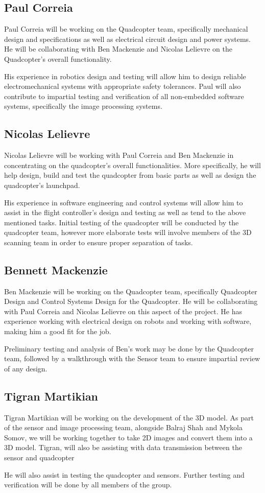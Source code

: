 \documentclass[10pt,letterpaper]{article}
\begin{document}
\subsection{Paul Correia}
Paul Correia will be working on the Quadcopter team, specifically mechanical design and specifications as well as electrical circuit design and power systems. He will be collaborating with Ben Mackenzie and Nicolas Lelievre on the Quadcopter's overall functionality.  \par
His experience in robotics design and testing will allow him to design reliable electromechanical systems with appropriate safety tolerances. Paul will also contribute to impartial testing and verification of all non-embedded software systems, specifically the image processing systems.

\subsection{Nicolas Lelievre} 
Nicolas Lelievre will be working with Paul Correia and Ben Mackenzie in concentrating on the quadcopter's overall functionalities. More specifically, he will help design, build and test the quadcopter from basic parts as well as design the quadcopter's launchpad. \par 
His experience in software engineering and control systems will allow him to assist in the flight controller's design and testing as well as tend to the above mentioned tasks. Initial testing of the quadcopter will be conducted by the quadcopter team, however more elaborate tests will involve members of the 3D scanning team in order to ensure proper separation of tasks. 

\subsection{Bennett Mackenzie} 
Ben Mackenzie will be working on the Quadcopter team, specifically Quadcopter Design and Control Systems Design for the Quadcopter. He will be collaborating with Paul Correia and Nicolas Lelievre on this aspect of the project. He has experience working with electrical design on robots and working with software, making him a good fit for the job. \par 
Preliminary testing and analysis of Ben's work may be done by the Quadcopter team, followed by a walkthrough with the Sensor team to ensure impartial review of any design.

\subsection{Tigran Martikian} 
Tigran Martikian will be working on the development of the 3D model. As part of the sensor and image processing team, alongside Balraj Shah and Mykola Somov, we will be working together to take 2D images and convert them into a 3D model. Tigran, will also be assisting with data transmission between the sensor and quadcopter \par
He will also assist in testing the quadcopter and sensors. Further testing and verification will be done by all members of the group.
\end{document}
